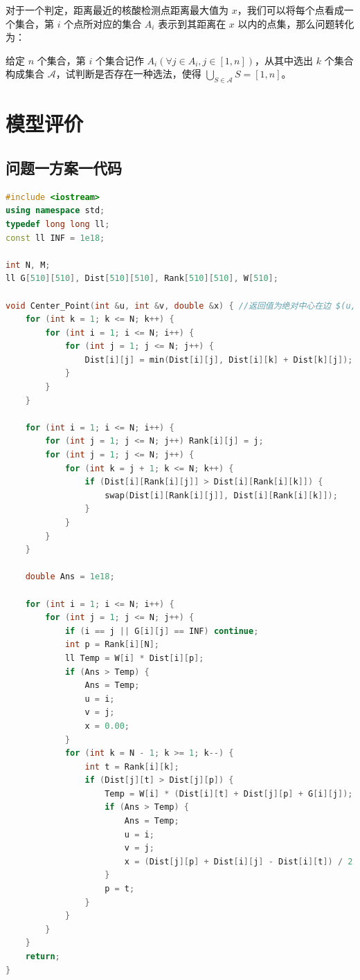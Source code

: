 \documentclass{cumcmthesis}
\begin{document}
对于一个判定，距离最近的核酸检测点距离最大值为 $x$，我们可以将每个点看成一个集合，第 $i$ 个点所对应的集合 $A_i$ 表示到其距离在 $x$ 以内的点集，那么问题转化为：

给定 $n$ 个集合，第 $i$ 个集合记作 $A_i(\forall j \in A_i, j 
\in [1,n])$，从其中选出 $k$ 个集合构成集合 $\mathscr{A}$，试判断是否存在一种选法，使得 $\bigcup\limits_{S \in \mathscr{A}} S = [1,n]$。

\section{模型评价}




\newpage

\begin{appendices}


\section{问题一方案一代码}

\begin{lstlisting}[language=cpp]
#include <iostream>
using namespace std;
typedef long long ll;
const ll INF = 1e18;

int N, M;
ll G[510][510], Dist[510][510], Rank[510][510], W[510];

void Center_Point(int &u, int &v, double &x) { //返回值为绝对中心在边 $(u,v)$，与 $u$ 的距离为 $x$
    for (int k = 1; k <= N; k++) {
        for (int i = 1; i <= N; i++) {
            for (int j = 1; j <= N; j++) {
                Dist[i][j] = min(Dist[i][j], Dist[i][k] + Dist[k][j]);
            }
        }
    }

    for (int i = 1; i <= N; i++) {
        for (int j = 1; j <= N; j++) Rank[i][j] = j;
        for (int j = 1; j <= N; j++) {
            for (int k = j + 1; k <= N; k++) {
                if (Dist[i][Rank[i][j]] > Dist[i][Rank[i][k]]) {
                    swap(Dist[i][Rank[i][j]], Dist[i][Rank[i][k]]);
                }
            }
        }
    }

    double Ans = 1e18;

    for (int i = 1; i <= N; i++) {
        for (int j = 1; j <= N; j++) {
            if (i == j || G[i][j] == INF) continue;
            int p = Rank[i][N];
            ll Temp = W[i] * Dist[i][p];
            if (Ans > Temp) {
                Ans = Temp;
                u = i;
                v = j;
                x = 0.00;
            }
            for (int k = N - 1; k >= 1; k--) {
                int t = Rank[i][k];
                if (Dist[j][t] > Dist[j][p]) {
                    Temp = W[i] * (Dist[i][t] + Dist[j][p] + G[i][j]);
                    if (Ans > Temp) {
                        Ans = Temp;
                        u = i;
                        v = j;
                        x = (Dist[j][p] + Dist[i][j] - Dist[i][t]) / 2.00;
                    }
                    p = t;
                }
            }
        }
    }
    return;
}
\end{lstlisting}


\end{appendices}
\end{document}
